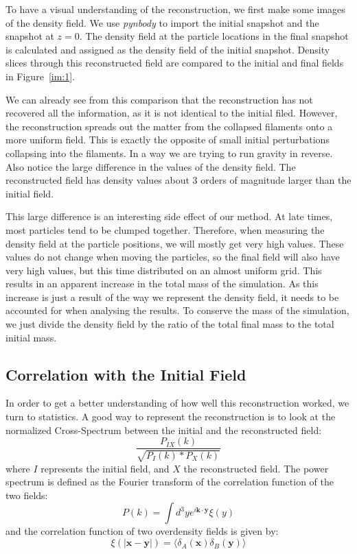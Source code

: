 To have a visual understanding of the reconstruction, we first make some images of the density field. We use \textit{pynbody} to import the initial snapshot and the snapshot at $z=0$. The density field at the particle locations in the final snapshot is calculated and assigned as the density field of the initial snapshot. Density slices through this reconstructed field are compared to the initial and final fields in Figure~\ref{im:1}. 

We can already see from this comparison that the reconstruction has not recovered all the information, as it is not identical to the initial filed. However, the reconstruction spreads out the matter from the collapsed filaments onto a more uniform field. This is exactly the opposite of small initial perturbations collapsing into the filaments. In a way we are trying to run gravity in reverse. Also notice the large difference in the values of the density field. The reconstructed field has density values about 3 orders of magnitude larger than the initial field.


This large difference is an interesting side effect of our method. At late times, most particles tend to be clumped together. Therefore, when measuring the density field at the particle positions, we will mostly get very high values. These values do not change when moving the particles, so the final field will also have very high values, but this time distributed on an almost uniform grid. This results in an apparent increase in the total mass of the simulation. As this increase is just a result of the way we represent the density field, it needs to be accounted for when analysing the results. To conserve the mass of the simulation, we just divide the density field by the ratio of the total final mass to the total initial mass.

\subsection{Correlation with the Initial Field}

In order to get a better understanding of how well this reconstruction worked, we turn to statistics. A good way to represent the reconstruction is to look at the normalized Cross-Spectrum between the initial and the reconstructed field: $$ \frac{P_{IX}(k)}{\sqrt{P_I(k) * P_X(k)}} $$ where $I$ represents the initial field, and $X$ the reconstructed field. The power spectrum is defined as the Fourier transform of the correlation function of the two fields:
\begin{equation}
    P(k) = \int{d^3y e^{i\textbf{k} \cdot \textbf{y}} \xi(y)}
\end{equation} 
and the correlation function of two overdensity fields is given by:
\begin{equation}
    \xi(|\textbf{x}-\textbf{y}|) = \langle \delta_A(\textbf{x})\delta_B(\textbf{y}) \rangle
\end{equation}

